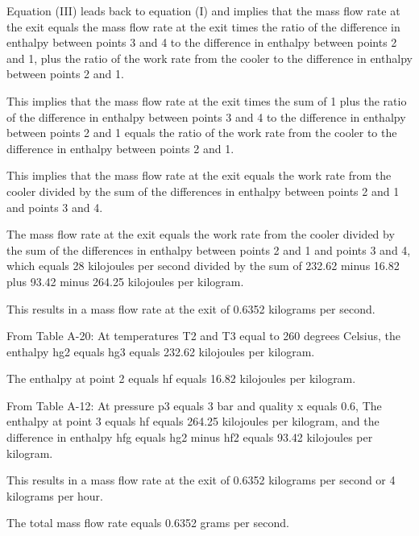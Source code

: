Equation (III) leads back to equation (I) and implies that the mass flow rate at the exit equals the mass flow rate at the exit times the ratio of the difference in enthalpy between points 3 and 4 to the difference in enthalpy between points 2 and 1, plus the ratio of the work rate from the cooler to the difference in enthalpy between points 2 and 1.

This implies that the mass flow rate at the exit times the sum of 1 plus the ratio of the difference in enthalpy between points 3 and 4 to the difference in enthalpy between points 2 and 1 equals the ratio of the work rate from the cooler to the difference in enthalpy between points 2 and 1.

This implies that the mass flow rate at the exit equals the work rate from the cooler divided by the sum of the differences in enthalpy between points 2 and 1 and points 3 and 4.

The mass flow rate at the exit equals the work rate from the cooler divided by the sum of the differences in enthalpy between points 2 and 1 and points 3 and 4, which equals 28 kilojoules per second divided by the sum of 232.62 minus 16.82 plus 93.42 minus 264.25 kilojoules per kilogram.

This results in a mass flow rate at the exit of 0.6352 kilograms per second.

From Table A-20:
At temperatures T2 and T3 equal to 260 degrees Celsius, the enthalpy hg2 equals hg3 equals 232.62 kilojoules per kilogram.

The enthalpy at point 2 equals hf equals 16.82 kilojoules per kilogram.

From Table A-12:
At pressure p3 equals 3 bar and quality x equals 0.6,
The enthalpy at point 3 equals hf equals 264.25 kilojoules per kilogram, and the difference in enthalpy hfg equals hg2 minus hf2 equals 93.42 kilojoules per kilogram.

This results in a mass flow rate at the exit of 0.6352 kilograms per second or 4 kilograms per hour.

The total mass flow rate equals 0.6352 grams per second.